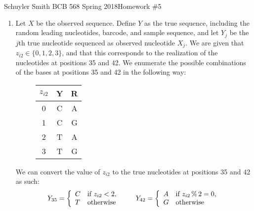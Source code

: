 \documentclass[10pt]{article}
\begin{document}
Schuyler Smith \hfill BCB 568 Spring 2018\hfill Homework \#5

\hrulefill

\begin{enumerate}[label = \textbf{\arabic*.}]
    \item Let $X$ be the observed sequence.  Define $Y$ as the true sequence, including the random leading nucleotides, barcode, and sample sequence, and let $Y_j$ be the $j$th true nucleotide sequenced as observed nucleotide $X_j$.  We are given that $z_{i2} \in \{0, 1, 2, 3\}$, and that this corresponds to the realization of the nucleotides at positions 35 and 42.  We enumerate the possible combinations of the bases at positions 35 and 42 in the following way:
                \begin{figure}[h]
                         \begin{center}
                            \begin{tabular}{ |c|c|c| } 
                                \hline
                                $z_{i2}$ & Y & R\\
                                \hline
                                0 & C & A \\
                                \hline
                                1 & C & G\\
                                \hline
                                2 & T & A\\
                                \hline
                                3 & T & G\\
                                \hline
                            \end{tabular}
                        \end{center}
                        \label{fig:alpha_1}
                \end{figure}
                
        We can convert the value of $z_{i2}$ to the true nucleotides at positions 35 and 42 as such:
            \begin{gather*}
            Y_{35} = \left\{\begin{array}{ll}
                            C & \textnormal{if }  z_{i2} < 2, \\
                            T & \textnormal{otherwise}
                        \end{array}\right.
            \qquad
            Y_{42} = \left\{\begin{array}{ll}
                            A & \textnormal{if }  z_{i2}\, \%\, 2 = 0, \\
                            G & \textnormal{otherwise}
                        \end{array}\right.
            \end{gather*}
    

\end{enumerate}
\end{document}
